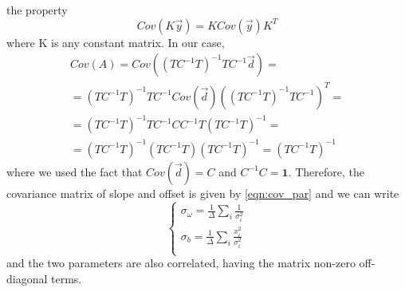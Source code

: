 \documentclass[a4paper,11pt,fleqn]{article}
\begin{document}
the property 
\begin{equation}
    Cov(K\vec{y}) = KCov(\vec{y})K^T
\end{equation}
where K is any constant matrix. In our case, 
\begin{gather*}
    Cov(A) =  Cov((TC^{-1}T)^{-1}TC^{-1}\vec{d}) = \\
    = (TC^{-1}T)^{-1}TC^{-1}Cov(\vec{d})((TC^{-1}T)^{-1}TC^{-1})^T = \\
    = (TC^{-1}T)^{-1}TC^{-1} C C^{-1}T(TC^{-1}T)^{-1} = \\ 
    = (TC^{-1}T)^{-1} (TC^{-1}T) (TC^{-1}T)^{-1} = (TC^{-1}T)^{-1}
\end{gather*}
where we used the fact that $Cov(\vec{d})=C$ and $C^{-1}C=\mathbf{1}$.
Therefore, the covariance matrix of slope and offset is given by 
\ref{eqn:cov_par} and we can write 
\begin{equation}
    \begin{cases}
        \sigma_{\omega} = \frac{1}{\Delta}\sum_i \frac{1}{\sigma_i^2} \\ 
        \sigma_b = \frac{1}{\Delta}\sum_i \frac{x_i^2}{\sigma_i^2} \\
    \end{cases}
\end{equation}
and the two parameters are also correlated, having the matrix non-zero 
off-diagonal terms.
\end{document}
